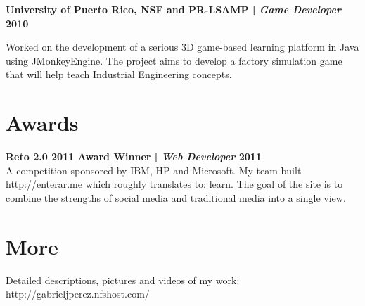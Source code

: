 \documentclass[margin,line]{res}
\begin{document}
\begin{resume}
{\bf University of Puerto Rico, NSF and PR-LSAMP | {\em Game Developer} \hfill {\bf 2010 \\} }
\vspace{-.01cm}

Worked on the development of a serious 3D game-based learning platform in Java using JMonkeyEngine. The project aims to develop a factory simulation game that will help teach Industrial Engineering concepts.

\section{\sc Awards}

{\bf Reto 2.0 2011 Award Winner | {\em Web Developer} \hfill {\bf 2011 \\} }
\vspace{-.01cm}
A competition sponsored by IBM, HP and Microsoft. My team built http://enterar.me which roughly translates to: learn. The goal of the site is to combine the strengths of social media and traditional media into a single view. 







\section{\sc More}
Detailed descriptions, pictures and videos of my work: http://gabrieljperez.nfshost.com/    \\

\end{resume}
\end{document}
